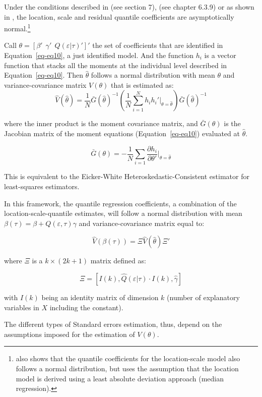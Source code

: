 \documentclass[
  authoryear,
  preprint,
  1p]{elsarticle}
\begin{document}
Under the conditions described in \citet{newey_chapter_1994} (see
section 7), \citet{cameron2005} (see chapter 6.3.9) or as shown in
\citet{mss2019}, the location, scale and residual quantile coefficients
are asymptotically normal.\footnote{\citet{zhao2000} also shows that the
  quantile coefficients for the location-scale model also follows a
  normal distribution, but uses the assumption that the location model
  is derived using a least absolute deviation approach (median
  regression).}

Call \(\theta=[ \beta' \ \ \gamma' \ \ Q(\varepsilon|\tau)' ]'\) the set
of coefficients that are identified in Equation~\ref{eq-eq10}, a just
identified model. And the function \(h_i\) is a vector function that
stacks all the moments at the individual level described in
Equation~\ref{eq-eq10}. Then \(\hat\theta\) follows a normal
distribution with mean \(\theta\) and variance-covariance matrix
\(V(\theta)\) that is estimated as: \[
\hat{V}(\hat\theta)=\frac{1}{N} 
\bar G(\hat\theta)^{-1} 
\left( \frac{1}{N} \sum_{i=1}^N h_i h_i'  \Big|_{\theta=\hat\theta} \right) 
\bar G(\hat\theta)^{-1} 
\]

where the inner product is the moment covariance matrix, and
\(\bar{G}(\theta)\) is the Jacobian matrix of the moment equations
(Equation~\ref{eq-eq10}) evaluated at \(\hat\theta\).

\[\bar{G}(\theta) =-\frac{1}{N} \sum_{i=1} \frac{\partial h_i}{\partial \theta'} \Big|_{\theta=\hat\theta}\]

This is equivalent to the Eicker-White Heteroskedastic-Consistent
estimator for least-squares estimators.

In this framework, the quantile regression coefficients, a combination
of the location-scale-quantile estimates, will follow a normal
distribution with mean \(\beta(\tau) = \beta+Q(\varepsilon,\tau)\gamma\)
and variance-covariance matrix equal to:

\[\hat{V}(\beta(\tau)) = \Xi \hat{V}(\hat\theta) \Xi'
\]

where \(\Xi\) is a \(k \times (2k+1)\) matrix defined as:

\[\Xi = [ I(k), \hat Q(\varepsilon|\tau) \cdot I(k), \hat \gamma ]
\]

with \(I(k)\) being an identity matrix of dimension \(k\) (number of
explanatory variables in \(X\) including the constant).

The different types of Standard errors estimation, thus, depend on the
assumptions imposed for the estimation of \(V(\theta)\).
\end{document}
